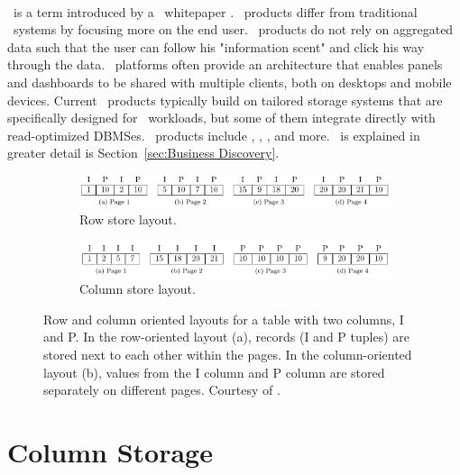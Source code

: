 \paragraph{\bd}
\label{par:Business Discovery}
\bd~is a term introduced by a \qlikview~whitepaper \cite{Qlik2014-vd}. \bd~products differ from traditional \bi~systems by focusing more on the end user. \bd~products do not rely on aggregated data such that the user can follow his "information scent" and click his way through the data. \bd~platforms often provide an architecture that enables panels and dashboards to be shared with multiple clients, both on desktops and mobile devices. Current \bd~products typically build on tailored storage systems that are specifically designed for \bd~workloads, but some of them integrate directly with read-optimized DBMSes. \bd~products include \tableau, \qlikview, \powerpivot, and more. \bd~is explained in greater detail is Section~\ref{sec:Business Discovery}.

\begin{figure}
  \centering
  \begin{subfigure}{\textwidth}
    \includegraphics[width=\textwidth]{img/row-store.png}
    \caption{Row store layout.}
    \label{fig:row-column-store-1} 
  \end{subfigure}
  \begin{subfigure}{\textwidth}
    \includegraphics[width=\textwidth]{img/column-store.png}
    \caption{Column store layout.}
    \label{fig:row-column-store-2} 
  \end{subfigure}
  \caption{Row and column oriented layouts for a table with two columns, I and P. In the row-oriented layout (a), records (I and P tuples) are stored next to each other within the pages. In the column-oriented layout (b), values from the I column and P column are stored separately on different pages. Courtesy of \cite{Bjorklund2011-wh}.}
  \label{fig:row-column-store} 
\end{figure}
\section{Column Storage}
\label{sec:Column Storage}


